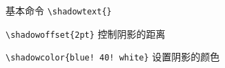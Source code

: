 \documentclass{ctexart}
\title{\shadowtext{\texttt{shadowtext} 产生阴影文字的宏包}}
\author{\TeX{}白兔}
\begin{document}
	
	\maketitle
	
	基本命令 \verb|\shadowtext{}|
	
	\verb|\shadowoffset{2pt}| 控制阴影的距离
	
	
	\verb|\shadowcolor{blue! 40! white}| 设置阴影的颜色
	
	
\end{document}
